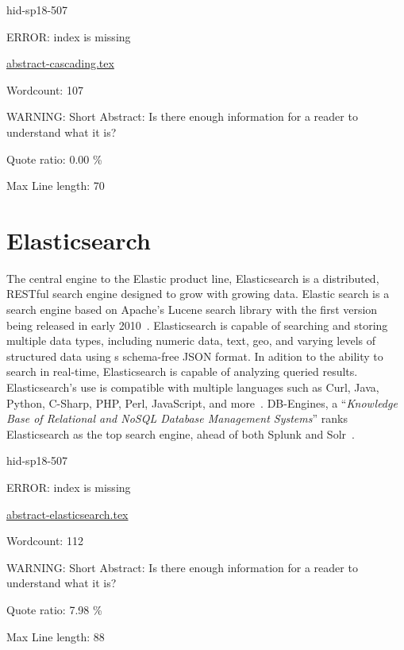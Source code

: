 \begin{IU}

hid-sp18-507

ERROR: index is missing

\href{https://github.com/cloudmesh-community/hid-sp18-507/blob/master//technology/abstract-cascading.tex}{abstract-cascading.tex}

 

Wordcount: 107

WARNING: Short Abstract: Is there enough information for a reader to understand what it is?


Quote ratio: 0.00 \%
 
Max Line length: 70
\end{IU}

\section{Elasticsearch}

The central engine to the Elastic product line, Elasticsearch is a
distributed, RESTful search engine designed to grow with growing
data. Elastic search is a search engine based on Apache's Lucene
search library with the first version being released in early
2010~\cite{hid-sp18-507-ElasticWiki}. Elasticsearch is capable of
searching and storing multiple data types, including numeric data,
text, geo, and varying levels of structured data using s schema-free
JSON format. In adition to the ability to search in real-time,
Elasticsearch is capable of analyzing queried results. Elasticsearch's
use is compatible with multiple languages such as Curl, Java, Python,
C-Sharp, PHP, Perl, JavaScript, and
more~\cite{hid-sp18-507-Elasticsearch}. DB-Engines, a \color{blue}``\emph{Knowledge Base
of Relational and NoSQL Database Management Systems}''\color{black} ranks
Elasticsearch as the top search engine, ahead of both Splunk and
Solr~\cite{hid-sp18-507-DBEngines}.


\begin{IU}

hid-sp18-507

ERROR: index is missing

\href{https://github.com/cloudmesh-community/hid-sp18-507/blob/master//technology/abstract-elasticsearch.tex}{abstract-elasticsearch.tex}

 

Wordcount: 112

WARNING: Short Abstract: Is there enough information for a reader to understand what it is?


Quote ratio: 7.98 \%
 
Max Line length: 88
\end{IU}


